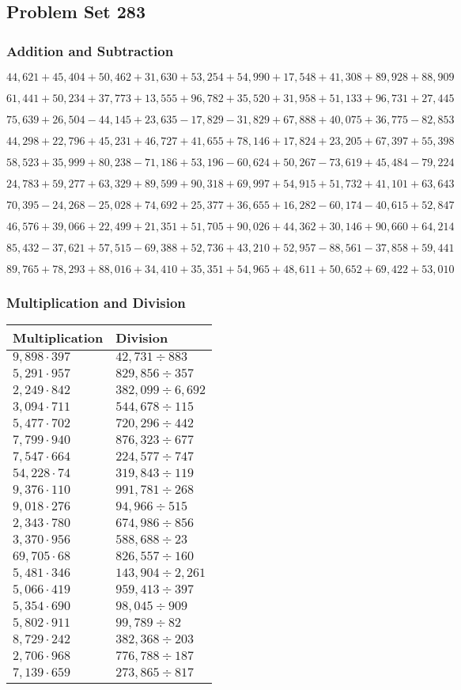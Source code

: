 \hypertarget{problem-set-283}{%
\subsection{Problem Set 283}\label{problem-set-283}}

\hypertarget{addition-and-subtraction}{%
\subsubsection{Addition and
Subtraction}\label{addition-and-subtraction}}

\(44,621+45,404+50,462+31,630+53,254+54,990+17,548+41,308+89,928+88,909\)

\(61,441+50,234+37,773+13,555+96,782+35,520+31,958+51,133+96,731+27,445\)

\(75,639+26,504-44,145+23,635-17,829-31,829+67,888+40,075+36,775-82,853\)

\(44,298+22,796+45,231+46,727+41,655+78,146+17,824+23,205+67,397+55,398\)

\(58,523+35,999+80,238-71,186+53,196-60,624+50,267-73,619+45,484-79,224\)

\(24,783+59,277+63,329+89,599+90,318+69,997+54,915+51,732+41,101+63,643\)

\(70,395-24,268-25,028+74,692+25,377+36,655+16,282-60,174-40,615+52,847\)

\(46,576+39,066+22,499+21,351+51,705+90,026+44,362+30,146+90,660+64,214\)

\(85,432-37,621+57,515-69,388+52,736+43,210+52,957-88,561-37,858+59,441\)

\(89,765+78,293+88,016+34,410+35,351+54,965+48,611+50,652+69,422+53,010\)

\hypertarget{multiplication-and-division}{%
\subsubsection{Multiplication and
Division}\label{multiplication-and-division}}

\begin{longtable}[]{@{}ll@{}}
\toprule
Multiplication & Division\tabularnewline
\midrule
\endhead
\(9,898\cdot397\) & \(42,731÷883\)\tabularnewline
\(5,291\cdot957\) & \(829,856÷357\)\tabularnewline
\(2,249\cdot842\) & \(382,099÷6,692\)\tabularnewline
\(3,094\cdot711\) & \(544,678÷115\)\tabularnewline
\(5,477\cdot702\) & \(720,296÷442\)\tabularnewline
\(7,799\cdot940\) & \(876,323÷677\)\tabularnewline
\(7,547\cdot664\) & \(224,577÷747\)\tabularnewline
\(54,228\cdot74\) & \(319,843÷119\)\tabularnewline
\(9,376\cdot110\) & \(991,781÷268\)\tabularnewline
\(9,018\cdot276\) & \(94,966÷515\)\tabularnewline
\(2,343\cdot780\) & \(674,986÷856\)\tabularnewline
\(3,370\cdot956\) & \(588,688÷23\)\tabularnewline
\(69,705\cdot68\) & \(826,557÷160\)\tabularnewline
\(5,481\cdot346\) & \(143,904÷2,261\)\tabularnewline
\(5,066\cdot419\) & \(959,413÷397\)\tabularnewline
\(5,354\cdot690\) & \(98,045÷909\)\tabularnewline
\(5,802\cdot911\) & \(99,789÷82\)\tabularnewline
\(8,729\cdot242\) & \(382,368÷203\)\tabularnewline
\(2,706\cdot968\) & \(776,788÷187\)\tabularnewline
\(7,139\cdot659\) & \(273,865÷817\)\tabularnewline
\bottomrule
\end{longtable}
